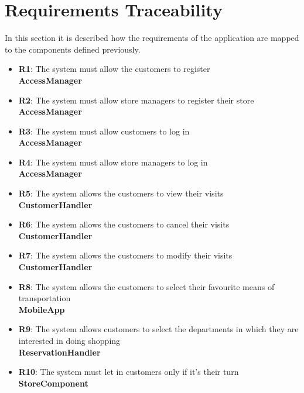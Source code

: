 \documentclass{article}
\begin{document}
\section{Requirements Traceability}
In this section it is described how the requirements of the application are mapped to the components defined previously.

\begin{itemize}
\item {\bfseries R1}: The system must allow the customers to register \\
\textbf{AccessManager}

\item {\bfseries R2}: The system must allow store managers to register their store \\
\textbf{AccessManager}

\item {\bfseries R3}: The system must allow customers to log in \\
\textbf{AccessManager}

\item {\bfseries R4}: The system must allow store managers to log in \\ 
\textbf{AccessManager}

\item {\bfseries R5}: The system allows the customers to view their visits \\
\textbf{CustomerHandler}

\item {\bfseries R6}: The system allows the customers to cancel their visits \\
\textbf{CustomerHandler}

\item {\bfseries R7}: The system allows the customers to modify their visits \\
\textbf{CustomerHandler}

\item {\bfseries R8}: The system allows the customers to select their favourite means of transportation \\
\textbf{MobileApp}

\item {\bfseries R9}: The system allows customers to select the departments in which they are interested in doing shopping \\
\textbf{ReservationHandler}

\item {\bfseries R10}: The system must let in customers only if it's their turn \\
\textbf{StoreComponent}


\end{itemize}
\end{document}
